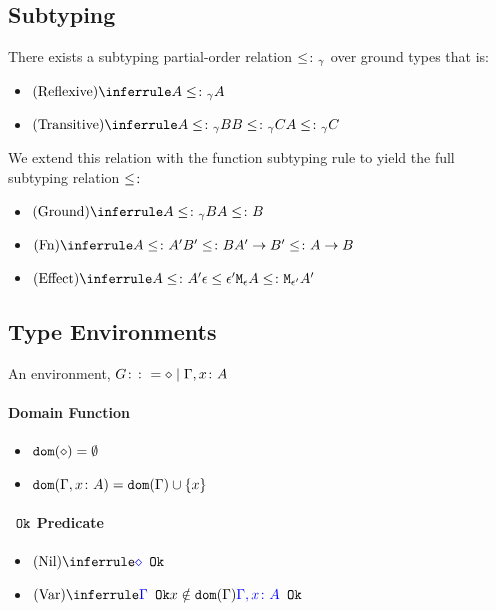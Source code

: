 \documentclass{report}
\begin{document}
\subsection{Subtyping}
    There exists a subtyping partial-order relation $\leq\colon_{\gamma}$ over ground types that is:
    \begin{itemize}
        \item $\ntreerulez{Reflexive}{A \subtype_{\ground} A}$
        \item $\ntreeruleII{Transitive}{A \subtype_{\ground} B }{ B \subtype_{\ground} C}{A \subtype_{\ground} C}$
    \end{itemize}

    We extend this relation with the function subtyping rule to yield the full subtyping relation $\leq\colon$

    \begin{itemize}
        \item $\ntreeruleI{Ground}{A \subtype_{\ground} B}{A \subtype B}$
        \item $\ntreeruleII{Fn}{A \subtype A' }{ B' \subtype B }{\fntype{A'}{B'} \subtype \ab}$
        \item $\ntreeruleII{Effect}{A\subtype A'}{\e\subeffect\e'}{\mea\subtype\M{\e'}{A'}}$
    \end{itemize}
\subsection{Type Environments}
An environment, $G \colon\colon= \diamond \mid \Gamma, x\colon A$ 
\paragraph{Domain Function}
\begin{itemize}
    \item $\texttt{dom}(\diamond) = \emptyset$
    \item $\texttt{dom}(\Gamma, x\colon A) =  \texttt{dom}(\Gamma)  \cup \left\{x \right\}$
\end{itemize}
\paragraph{${\color{blue} } \texttt{ Ok}$ Predicate}
\begin{itemize}
    \item $\ntreerulez{Nil}{\ok{\nil}}$
    \item $\ntreeruleII{Var}{\ok{\G} }{ x\notin \dom{\G}}{\ok{\gax}}$
\end{itemize}
\end{document}
